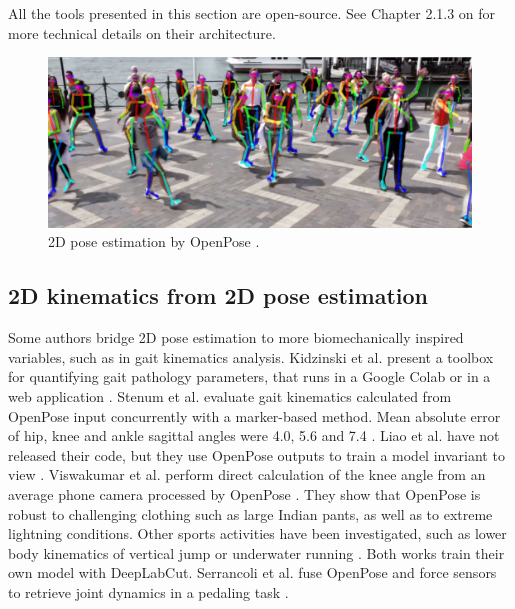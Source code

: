 All the tools presented in this section are open-source. See Chapter 2.1.3 on  for more technical details on their architecture.

\begin{figure}[hbtp]
	\centering
	\def\svgwidth{1\columnwidth}
	\fontsize{10pt}{10pt}\selectfont
	\includegraphics[width=0.9\linewidth]{"../Chap1/Figures/Fig_OpenPose.JPG"}
	\caption{2D pose estimation by OpenPose \cite{Cao2019}.}
	\label{fig_openpose}
\end{figure}


\subsection{2D kinematics from 2D pose estimation}

Some authors bridge 2D pose estimation to more biomechanically inspired variables, such as in gait kinematics analysis. Kidzinski et al. present a toolbox for quantifying gait pathology parameters, that runs in a Google Colab or in a web application \cite{Kidziński2020}. Stenum et al. evaluate gait kinematics calculated from OpenPose input concurrently with a marker-based method. Mean absolute error of hip, knee and ankle sagittal angles were 4.0\degree{}, 5.6\degree{} and 7.4\degree{} \cite{Stenum2021}. Liao et al. have not released their code, but they use OpenPose outputs to train a model invariant to view \cite{Liao2020}. Viswakumar et al. perform direct calculation of the knee angle from an average phone camera processed by OpenPose \cite{Viswakumar2019}. They show that OpenPose is robust to challenging clothing such as large Indian pants, as well as to extreme lightning conditions. Other sports activities have been investigated, such as lower body kinematics of vertical jump \cite{Drazan2021} or underwater running \cite{Cronin2019}. Both works train their own model with DeepLabCut. Serrancoli et al. fuse OpenPose and force sensors to retrieve joint dynamics in a pedaling task \cite{Serrancolí2020}. 

